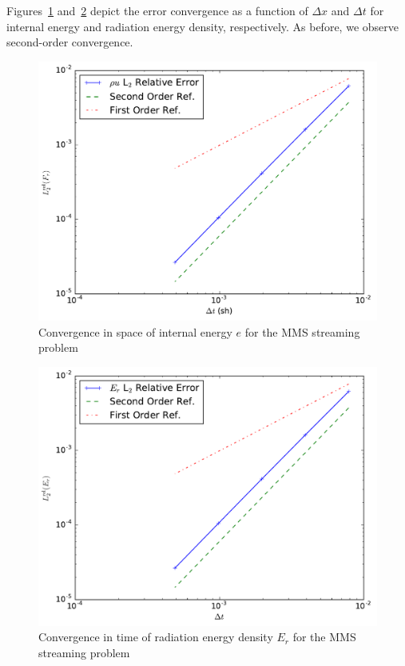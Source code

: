 \documentclass[preprint,12pt]{elsarticle}
\newcommand{\E}{{E_r}}
\begin{document}
Figures~\ref{fig:streaming_e} and~\ref{fig:streaming_erad} depict the error convergence as a function of $\Delta x$ and $\Delta t$ for
internal energy and radiation energy density, respectively.  As before, we observe
second-order convergence.

\begin{figure}[ht]
   \centering
   \includegraphics[width=\textwidth]{figures/MMS_streaming_frad_convergence.pdf}
   \caption{\label{fig:streaming_e}Convergence in space of internal energy $e$ for the MMS streaming problem}
\end{figure}
\begin{figure}[ht]
   \centering
   \includegraphics[width=\textwidth]{figures/MMS_streaming_erad_convergence.pdf}
   \caption{\label{fig:streaming_erad}Convergence in time of radiation energy density $\E$ for the MMS streaming problem}
\end{figure}
\end{document}
